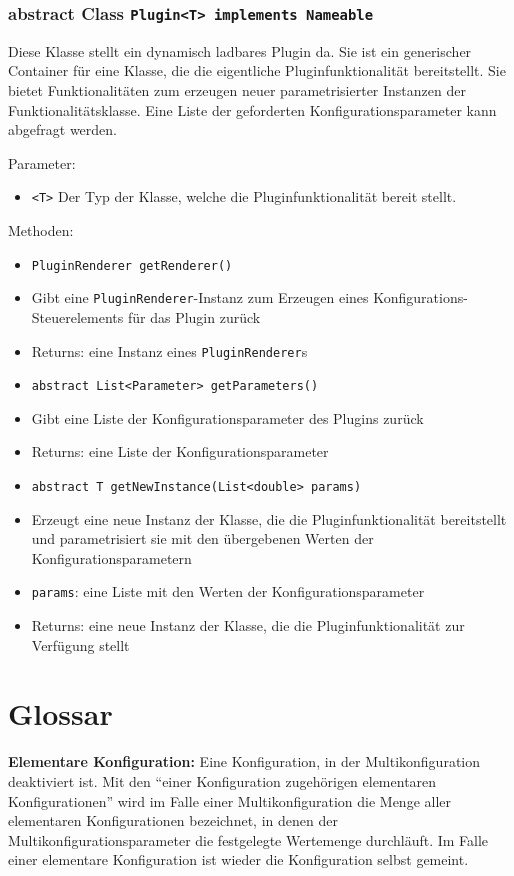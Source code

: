 \documentclass[parskip=full,11pt]{scrartcl}
\begin{document}
\subsubsection{abstract Class \texttt{Plugin<T> implements  Nameable}}

Diese Klasse stellt ein dynamisch ladbares Plugin da. Sie ist ein generischer Container für eine Klasse, die die eigentliche Pluginfunktionalität bereitstellt. Sie bietet Funktionalitäten zum erzeugen neuer parametrisierter Instanzen der Funktionalitätsklasse. Eine Liste der geforderten Konfigurationsparameter kann abgefragt werden.

Parameter:
\begin{itemize}\itemsep -10pt
	\item \texttt{<T>} Der Typ der Klasse, welche die Pluginfunktionalität bereit stellt. 
\end{itemize}

Methoden:
\begin{itemize}\itemsep -10pt
	\item \texttt{PluginRenderer getRenderer()}
	\item[] Gibt eine \texttt{PluginRenderer}-Instanz zum Erzeugen eines Konfigurations-Steuerelements für das Plugin zurück
	\item[] Returns: eine Instanz eines \texttt{PluginRenderer}s
	\item \texttt{abstract List<Parameter> getParameters()}
	\item[] Gibt eine Liste der Konfigurationsparameter des Plugins zurück
	\item[] Returns: eine Liste der Konfigurationsparameter
	\item \texttt{abstract T getNewInstance(List<double> params)}
	\item[] Erzeugt eine neue Instanz der Klasse, die die Pluginfunktionalität bereitstellt und parametrisiert sie mit den übergebenen Werten der Konfigurationsparametern
	\item[] \texttt{params}: eine Liste mit den Werten der Konfigurationsparameter
	\item[] Returns: eine neue Instanz der Klasse, die die Pluginfunktionalität zur Verfügung stellt
\end{itemize}

\section{Glossar}
\textbf{Elementare Konfiguration:}
Eine Konfiguration, in der Multikonfiguration deaktiviert ist. Mit den \enquote{einer Konfiguration zugehörigen elementaren Konfigurationen} wird im Falle einer Multikonfiguration die Menge aller elementaren Konfigurationen bezeichnet, in denen der Multikonfigurationsparameter die festgelegte Wertemenge durchläuft. Im Falle einer elementare Konfiguration ist wieder die Konfiguration selbst gemeint.
\end{document}
